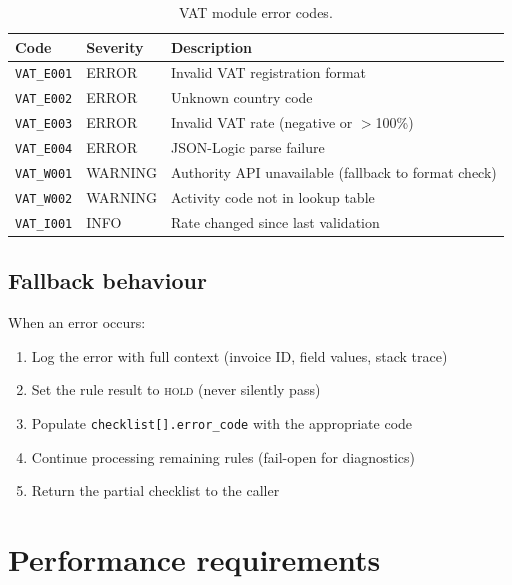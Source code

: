 \documentclass[11pt,a4paper,twoside]{report}
\begin{document}
\begin{table}[htbp]
\centering
\caption{VAT module error codes.}
\label{tab:vat-errors}
\footnotesize
\begin{tabularx}{\linewidth}{@{}l l X@{}}
\toprule
\textbf{Code} & \textbf{Severity} & \textbf{Description} \\ \midrule
\texttt{VAT\_E001} & ERROR & Invalid VAT registration format \\
\texttt{VAT\_E002} & ERROR & Unknown country code \\
\texttt{VAT\_E003} & ERROR & Invalid VAT rate (negative or $>$100\%) \\
\texttt{VAT\_E004} & ERROR & JSON-Logic parse failure \\
\texttt{VAT\_W001} & WARNING & Authority API unavailable (fallback to format check) \\
\texttt{VAT\_W002} & WARNING & Activity code not in lookup table \\
\texttt{VAT\_I001} & INFO & Rate changed since last validation \\
\bottomrule
\end{tabularx}
\end{table}

\subsection{Fallback behaviour}

When an error occurs:

\begin{enumerate}
\item Log the error with full context (invoice ID, field values, stack trace)
\item Set the rule result to \textsc{hold} (never silently pass)
\item Populate \texttt{checklist[].error\_code} with the appropriate code
\item Continue processing remaining rules (fail-open for diagnostics)
\item Return the partial checklist to the caller
\end{enumerate}

\section{Performance requirements}
\end{document}
